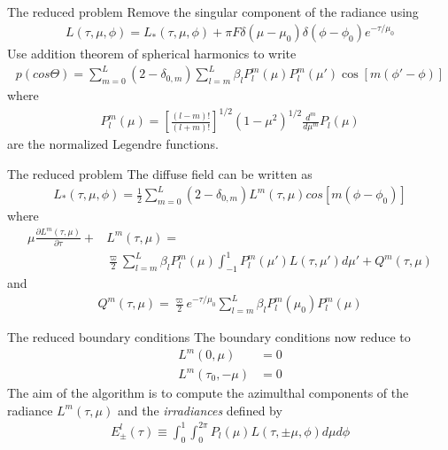 \documentclass[14]{beamer}
\newcommand{\pfrac}[2]{\frac{\partial #1}{\partial #2}}
\begin{document}
\begin{frame}{The reduced problem}
  Remove the singular component of the radiance using
  \begin{align}
    L(\tau,\mu,\phi) = L_*(\tau,\mu,\phi) 
    + \pi F \delta(\mu-\mu_0) \delta(\phi-\phi_0) e^{-\tau/\mu_0}
  \end{align}
  Use addition theorem of spherical harmonics to write
  \begin{align}
    p(cos\Theta) = \sum_{m=0}^L(2-\delta_{0,m})
    \sum_{l=m}^L\beta_l P_l^m(\mu) P_l^m(\mu')
    \cos[m(\phi'-\phi)]
  \end{align}
  where
  \begin{align}
    P_l^m(\mu) = \left[
      \frac{(l-m)!}{(l+m)!}
      \right]^{1/2}
      (1-\mu^2)^{1/2}\frac{d^m}{d\mu^m}
      P_l(\mu)
  \end{align}
  are the normalized Legendre functions.
\end{frame}

\begin{frame}{The reduced problem}
  The diffuse field can be written as
  \begin{align}
    L_*(\tau,\mu,\phi) = \frac{1}{2} \sum_{m=0}^L
    (2-\delta_{0,m})L^m(\tau,\mu) cos[m(\phi-\phi_0)]
  \end{align}
  where
  \begin{align}
    \mu\pfrac{L^m(\tau,\mu)}{\tau} + &L^m(\tau,\mu)
    = \\
    &\frac{\varpi}{2}
    \sum_{l=m}^L \beta_l P_l^m(\mu)
    \int_{-1}^1
    P_l^m(\mu') L(\tau,\mu') d\mu'
    + Q^m(\tau,\mu)
  \end{align}
  and 
  \begin{align}
    Q^m(\tau,\mu) = \frac{\varpi}{2}e^{-\tau/\mu_0}
    \sum_{l=m}^L \beta_l P^m_l(\mu_0) P_l^m(\mu)
  \end{align}
\end{frame}

\begin{frame}{The reduced boundary conditions}
  The boundary conditions now reduce to
  \begin{align}
    L^m(0, \mu) &= 0 \\
    L^m(\tau_0, -\mu) &= 0
  \end{align}
  The aim of the algorithm is to compute the azimulthal components of
  the radiance $L^m(\tau,\mu)$ and the \emph{irradiances} defined by
  \begin{align}
    E_\pm^l(\tau) \equiv \int_0^1 \int_0^{2\pi}
    P_l(\mu) L(\tau,\pm \mu, \phi) d\mu d\phi
  \end{align}
\end{frame}
\end{document}
